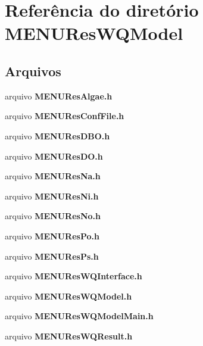 \section{Referência do diretório M\+E\+N\+U\+Res\+W\+Q\+Model}
\label{dir_62270a628eb286facc06f8e4ca26ca48}
\subsection*{Arquivos}
\begin{DoxyCompactItemize}
\item 
arquivo {\bf M\+E\+N\+U\+Res\+Algae.\+h}
\item 
arquivo {\bf M\+E\+N\+U\+Res\+Conf\+File.\+h}
\item 
arquivo {\bf M\+E\+N\+U\+Res\+D\+B\+O.\+h}
\item 
arquivo {\bf M\+E\+N\+U\+Res\+D\+O.\+h}
\item 
arquivo {\bf M\+E\+N\+U\+Res\+Na.\+h}
\item 
arquivo {\bf M\+E\+N\+U\+Res\+Ni.\+h}
\item 
arquivo {\bf M\+E\+N\+U\+Res\+No.\+h}
\item 
arquivo {\bf M\+E\+N\+U\+Res\+Po.\+h}
\item 
arquivo {\bf M\+E\+N\+U\+Res\+Ps.\+h}
\item 
arquivo {\bf M\+E\+N\+U\+Res\+W\+Q\+Interface.\+h}
\item 
arquivo {\bf M\+E\+N\+U\+Res\+W\+Q\+Model.\+h}
\item 
arquivo {\bf M\+E\+N\+U\+Res\+W\+Q\+Model\+Main.\+h}
\item 
arquivo {\bf M\+E\+N\+U\+Res\+W\+Q\+Result.\+h}
\end{DoxyCompactItemize}
